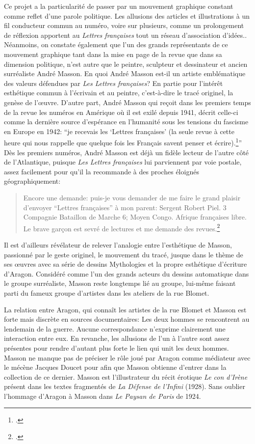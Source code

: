 Ce projet a la particularité de passer par un mouvement graphique constant comme reflet d’une parole politique. Les allusions des articles et illustrations à un fil conducteur commun au numéro, voire sur plusieurs, comme un prolongement de réflexion apportent au \emph{Lettres françaises }tout un réseau d'association d'idées.. Néanmoins, on constate également que l’un des grands représentants de ce mouvement graphique tant dans la mise en page de la revue que dans sa dimension politique, n’est autre que le peintre, sculpteur et dessinateur et ancien surréaliste André Masson. En quoi André Masson est-il un artiste emblématique des valeurs défendues par \emph{Les Lettres françaises}? En partie pour l’intérêt esthétique commun à l’écrivain et au peintre, c’est-à-dire le tracé originel, la genèse de l’\oe{}uvre. D’autre part, André Masson qui reçoit dans les premiers temps de la revue les numéros en Amérique où il est exilé depuis 1941, décrit celle-ci comme la dernière source d’espérance en l’humanité sous les tensions du fascisme en Europe en 1942: \enquote{je recevais les \enquote{Lettres françaises} (la seule revue à cette heure qui nous rappelle que quelque fois les Français savent penser et écrire).\footcite[]{anneessurrealistes}} Dès les premiers numéros, André Masson est déjà un fidèle lecteur de l’autre côté de l’Atlantique, puisque \emph{Les Lettres françaises} lui parviennent par voie postale, assez facilement pour qu’il la recommande à des proches éloignés géographiquement: 
\begin{quote}
Encore une demande: puis-je vous demander de me faire le grand plaisir d’envoyer \enquote{Lettres françaises} à mon parent: Sergent Robert Piel. 3\ieme{} Compagnie Bataillon de Marche \No{}6; Moyen Congo. Afrique françaises libre. Le brave garçon est sevré de lectures et me demande des revues.\footcite[]{anneessurrealistes}
\end{quote}
Il est d’ailleurs révélateur de relever l’analogie entre l’esthétique de Masson, passionné par le geste originel, le mouvement du tracé, jusque dans le thème de ses \oe{}uvres avec sa série de dessins Mythologies et la propre esthétique d’écriture d’Aragon. Considéré comme l’un des grands acteurs du dessins automatique dans le groupe surréaliste, Masson reste longtemps lié au groupe, lui-même faisant parti du fameux groupe d’artistes dans les ateliers de la rue Blomet. 

La relation entre Aragon, qui connaît les artistes de la rue Blomet et Masson est forte mais discrète en sources documentaires: Les deux hommes se rencontrent au lendemain de la guerre. Aucune correspondance n’exprime clairement une interaction entre eux. En revanche, les allusions de l’un à l’autre sont assez présentes pour rendre d’autant plus forte le lien qui unit les deux hommes. Masson ne manque pas de préciser le rôle joué par Aragon comme médiateur avec le mécène Jacques Doucet pour afin que Masson obtienne d’entrer dans la collection de ce dernier. Masson est l’illustrateur du récit érotique \emph{Le con d'Irène} présent dans les textes fragmentés de \emph{La Défense de l’Infini} (1928). Sans oublier l’hommage d’Aragon à Masson dans \emph{Le Paysan de Paris} de 1924. 

